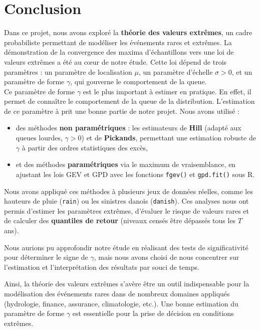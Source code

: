 \documentclass{article}
\theoremstyle{plain}
\theoremstyle{definition}
\theoremstyle{plain}
\begin{document}
\section{Conclusion}

Dans ce projet, nous avons exploré la \textbf{théorie des valeurs extrêmes}, un cadre probabiliste permettant de modéliser les événements rares et extrêmes. 
La démonstration de la convergence des maxima d’échantillons vers une loi de valeurs extrêmes a été au cœur de notre étude. Cette loi dépend de trois paramètres : un paramètre de localisation $\mu$, un paramètre d’échelle $\sigma > 0$, et un paramètre de forme $\gamma$, qui gouverne le comportement de la queue.
\\
Ce paramètre de forme $\gamma$ est le plus important à estimer en pratique. En effet, il permet de connaître le comportement de la queue de la distribution.
L'estimation de ce paramètre à prit une bonne partie de notre projet. Nous avons utilisé :
\begin{itemize}
    \item des méthodes \textbf{non paramétriques} : les estimateurs de \textbf{Hill} (adapté aux queues lourdes, $\gamma > 0$) et de \textbf{Pickands}, permettant une estimation robuste de $\gamma$ à partir des ordres statistiques des excès,
    \item et des méthodes \textbf{paramétriques} via le maximum de vraisemblance, en ajustant les lois GEV et GPD avec les fonctions \texttt{fgev()} et \texttt{gpd.fit()} sous \textsf{R}.
\end{itemize}

\medskip

Nous avons appliqué ces méthodes à plusieurs jeux de données réelles, comme les hauteurs de pluie (\texttt{rain}) ou les sinistres danois (\texttt{danish}). Ces analyses nous ont permis d'estimer les paramètres extrêmes, d'évaluer le risque de valeurs rares et de calculer des \textbf{quantiles de retour} (niveaux censés être dépassés tous les $T$ ans).

\medskip

Nous aurions pu approfondir notre étude en réalisant des tests de significativité pour déterminer le signe de $\gamma$, mais nous avons choisi de nous concentrer sur l'estimation et l'interprétation des résultats par souci de temps.

\medskip

Ainsi, la théorie des valeurs extrêmes s’avère être un outil indispensable pour la modélisation des événements rares dans de nombreux domaines appliqués (hydrologie, finance, assurance, climatologie, etc.). Une bonne estimation du paramètre de forme $\gamma$ est essentielle pour la prise de décision en conditions extrêmes.
\end{document}

